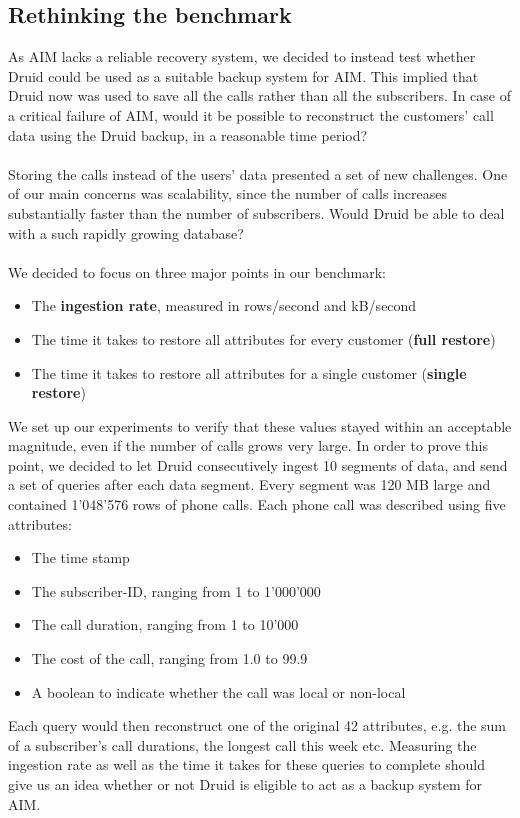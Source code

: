 \documentclass[11pt,singlecolumn]{scrartcl}
\begin{document}
\subsection{Rethinking the benchmark}
As AIM lacks a reliable recovery system, we decided to instead test whether Druid could be used as a suitable backup system for AIM. This implied that Druid now was used to save all the calls rather than all the subscribers. In case of a critical failure of AIM, would it be possible to reconstruct the customers' call data using the Druid backup, in a reasonable time period?\\\\
Storing the calls instead of the users' data presented a set of new challenges. One of our main concerns was scalability, since the number of calls increases substantially faster than the number of subscribers. Would Druid be able to deal with a such rapidly growing database?\\\\We decided to focus on three major points in our benchmark:
\begin{itemize}

 \item The \textbf{ingestion rate}, measured in rows/second and kB/second
 \item The time it takes to restore all attributes for every customer (\textbf{full restore})
 \item The time it takes to restore all attributes for a single customer (\textbf{single restore})
\end{itemize}
We set up our experiments to verify that these values stayed within an acceptable magnitude, even if the number of calls grows very large. In order to prove this point, we decided to let Druid consecutively ingest 10 segments of data, and send a set of queries after each data segment. Every segment was 120 MB large and contained 1'048'576 rows of phone calls. Each phone call was described using five attributes:
\begin{itemize}

 \item  The time stamp
 \item  The subscriber-ID, ranging from 1 to 1'000'000
 \item  The call duration, ranging from 1 to 10'000
 \item  The cost of the call, ranging from 1.0 to 99.9
 \item  A boolean to indicate whether the call was local or non-local
\end{itemize}
Each query would then reconstruct one of the original 42 attributes, e.g. the sum of a subscriber's call durations, the longest call this week etc. Measuring the ingestion rate as well as the time it takes for these queries to complete should give us an idea whether or not Druid is eligible to act as a backup system for AIM. 
\end{document}
